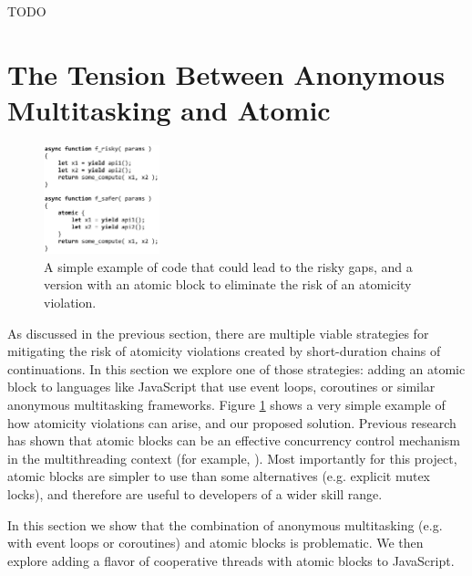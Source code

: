 \documentclass[acmsmall,anonymous,review]{acmart}\settopmatter{printfolios=true,printccs=false,printacmref=false}
\begin{document}
TODO

\section{The Tension Between Anonymous Multitasking and Atomic}

\begin{figure}
\includegraphics[width=0.3\textwidth,left]{Code/async_atomic_js}
\caption{A simple example of code that could lead to the risky gaps, and a version with an atomic block to eliminate the risk of an atomicity violation.}
\label{fig:async_atomic_js}
\end{figure}

As discussed in the previous section, there are multiple viable strategies for mitigating the risk of atomicity violations created by short-duration chains of continuations.
In this section we explore one of those strategies: adding an atomic block to languages like JavaScript that use event loops, coroutines or similar anonymous multitasking frameworks.
Figure \ref{fig:async_atomic_js} shows a very simple example of how atomicity violations can arise, and our proposed solution.
Previous research has shown that atomic blocks can be an effective concurrency control mechanism in the multithreading context (for example, \cite{Harris2005, Grossman2007, Pankratius2014}).
Most importantly for this project, atomic blocks are simpler to use than some alternatives (e.g. explicit mutex locks), and therefore are useful to developers of a wider skill range\footnotemark{}.


In this section we show that the combination of anonymous multitasking (e.g. with event loops or coroutines) and atomic blocks is problematic.
We then explore adding a flavor of cooperative threads with atomic blocks to JavaScript.
\end{document}
